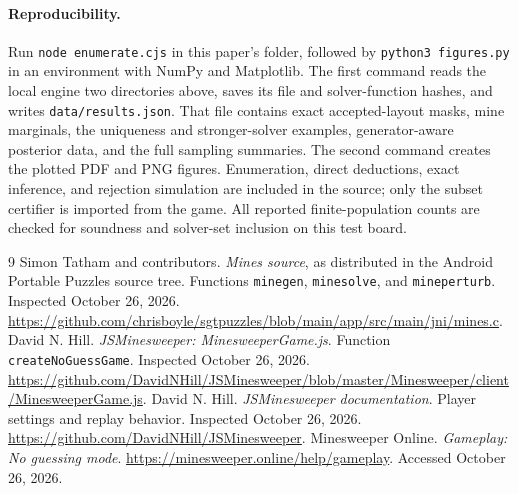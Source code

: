 \documentclass[11pt]{article}
\begin{document}
\paragraph{Reproducibility.}
Run \texttt{node enumerate.cjs} in this paper's folder, followed by \texttt{python3 figures.py} in an environment with NumPy and Matplotlib. The first command reads the local engine two directories above, saves its file and solver-function hashes, and writes \texttt{data/results.json}. That file contains exact accepted-layout masks, mine marginals, the uniqueness and stronger-solver examples, generator-aware posterior data, and the full sampling summaries. The second command creates the plotted PDF and PNG figures. Enumeration, direct deductions, exact inference, and rejection simulation are included in the source; only the subset certifier is imported from the game. All reported finite-population counts are checked for soundness and solver-set inclusion on this test board.

\begin{thebibliography}{9}
\small
{} Simon Tatham and contributors. \emph{Mines source}, as distributed in the Android Portable Puzzles source tree. Functions \texttt{minegen}, \texttt{minesolve}, and \texttt{mineperturb}. Inspected October 26, 2026. \url{https://github.com/chrisboyle/sgtpuzzles/blob/main/app/src/main/jni/mines.c}.
 David N. Hill. \emph{JSMinesweeper: MinesweeperGame.js}. Function \texttt{createNoGuessGame}. Inspected October 26, 2026. \url{https://github.com/DavidNHill/JSMinesweeper/blob/master/Minesweeper/client/MinesweeperGame.js}.
 David N. Hill. \emph{JSMinesweeper documentation}. Player settings and replay behavior. Inspected October 26, 2026. \url{https://github.com/DavidNHill/JSMinesweeper}.
 Minesweeper Online. \emph{Gameplay: No guessing mode}. \url{https://minesweeper.online/help/gameplay}. Accessed October 26, 2026.
\end{thebibliography}
\end{document}
